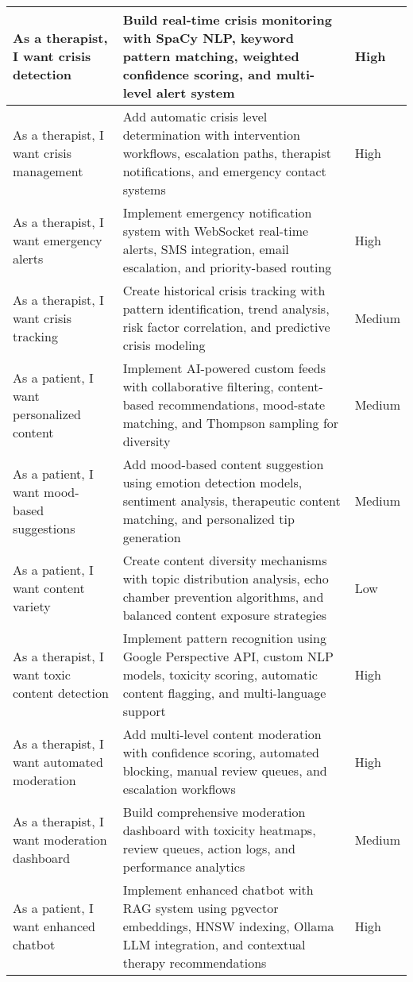 \begin{longtable}{|p{4.2cm}|p{7.2cm}|p{2.2cm}|}
\hline
As a therapist, I want crisis detection & Build real-time crisis monitoring with SpaCy NLP, keyword pattern matching, weighted confidence scoring, and multi-level alert system & High \\
\hline
As a therapist, I want crisis management & Add automatic crisis level determination with intervention workflows, escalation paths, therapist notifications, and emergency contact systems & High \\
\hline
As a therapist, I want emergency alerts & Implement emergency notification system with WebSocket real-time alerts, SMS integration, email escalation, and priority-based routing & High \\
\hline
As a therapist, I want crisis tracking & Create historical crisis tracking with pattern identification, trend analysis, risk factor correlation, and predictive crisis modeling & Medium \\
\hline
As a patient, I want personalized content & Implement AI-powered custom feeds with collaborative filtering, content-based recommendations, mood-state matching, and Thompson sampling for diversity & Medium \\
\hline
As a patient, I want mood-based suggestions & Add mood-based content suggestion using emotion detection models, sentiment analysis, therapeutic content matching, and personalized tip generation & Medium \\
\hline
As a patient, I want content variety & Create content diversity mechanisms with topic distribution analysis, echo chamber prevention algorithms, and balanced content exposure strategies & Low \\
\hline
As a therapist, I want toxic content detection & Implement pattern recognition using Google Perspective API, custom NLP models, toxicity scoring, automatic content flagging, and multi-language support & High \\
\hline
As a therapist, I want automated moderation & Add multi-level content moderation with confidence scoring, automated blocking, manual review queues, and escalation workflows & High \\
\hline
As a therapist, I want moderation dashboard & Build comprehensive moderation dashboard with toxicity heatmaps, review queues, action logs, and performance analytics & Medium \\
\hline
As a patient, I want enhanced chatbot & Implement enhanced chatbot with RAG system using pgvector embeddings, HNSW indexing, Ollama LLM integration, and contextual therapy recommendations & High \\

\end{longtable}
